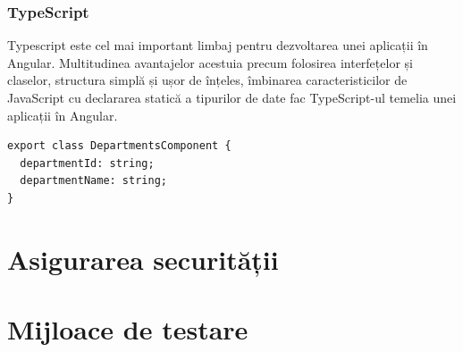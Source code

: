 \vspace{0.5em}

\begin{minipage}{\textwidth}
\hfill
\begin{minipage}{0.9\textwidth}
\subsubsection{TypeScript}
\end{minipage}
\end{minipage}

\hspace{0cm} Typescript este cel mai important limbaj pentru dezvoltarea unei aplicații în Angular. Multitudinea avantajelor acestuia precum folosirea interfețelor și claselor, structura simplă și ușor de înțeles, îmbinarea caracteristicilor de JavaScript cu declararea statică a tipurilor de date fac TypeScript-ul temelia unei aplicații în Angular.

\begin{center}
\begin{minipage}{0.8\textwidth}
\captionsetup{type=listing}
   \begin{lstlisting}
export class DepartmentsComponent {
  departmentId: string;
  departmentName: string;
}
\end{lstlisting} 
\end{minipage}
\end{center}

\vspace{1.5em}
\section{Asigurarea securității}

\section{Mijloace de testare}

